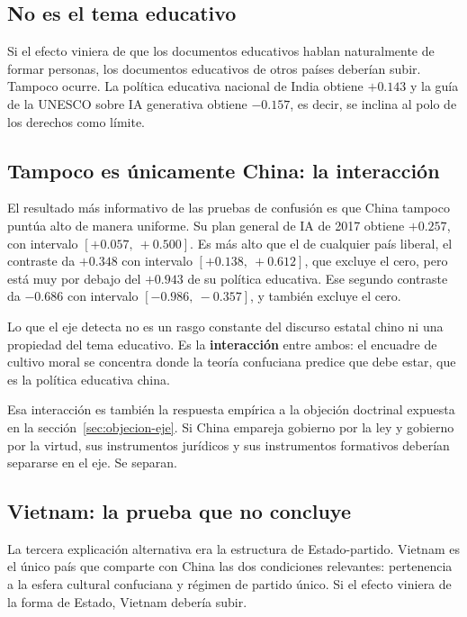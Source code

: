 \subsection{No es el tema educativo}

Si el efecto viniera de que los documentos educativos hablan naturalmente de formar personas, los documentos educativos de otros países deberían subir. Tampoco ocurre. La política educativa nacional de India obtiene $+0.143$ y la guía de la UNESCO sobre IA generativa obtiene $-0.157$, es decir, se inclina al polo de los derechos como límite.

\subsection{Tampoco es únicamente China: la interacción}

El resultado más informativo de las pruebas de confusión es que China tampoco puntúa alto de manera uniforme. Su plan general de IA de 2017 obtiene $+0.257$, con intervalo $[+0.057,\ +0.500]$. Es más alto que el de cualquier país liberal, el contraste da $+0.348$ con intervalo $[+0.138,\ +0.612]$, que excluye el cero, pero está muy por debajo del $+0.943$ de su política educativa. Ese segundo contraste da $-0.686$ con intervalo $[-0.986,\ -0.357]$, y también excluye el cero.

Lo que el eje detecta no es un rasgo constante del discurso estatal chino ni una propiedad del tema educativo. Es la \textbf{interacción} entre ambos: el encuadre de cultivo moral se concentra donde la teoría confuciana predice que debe estar, que es la política educativa china.

Esa interacción es también la respuesta empírica a la objeción doctrinal expuesta en la sección~\ref{sec:objecion-eje}. Si China empareja gobierno por la ley y gobierno por la virtud, sus instrumentos jurídicos y sus instrumentos formativos deberían separarse en el eje. Se separan.

\subsection{Vietnam: la prueba que no concluye}

La tercera explicación alternativa era la estructura de Estado-partido. Vietnam es el único país que comparte con China las dos condiciones relevantes: pertenencia a la esfera cultural confuciana y régimen de partido único. Si el efecto viniera de la forma de Estado, Vietnam debería subir.

